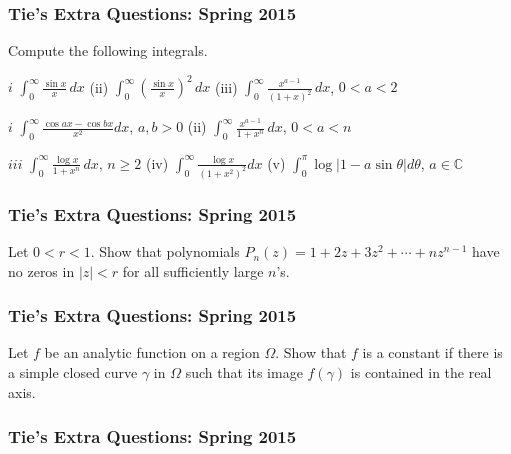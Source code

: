 \hypertarget{ties-extra-questions-spring-2015-12}{%
\subsubsection{Tie's Extra Questions: Spring
2015}\label{ties-extra-questions-spring-2015-12}}

Compute the following integrals.

\(i\) \(\displaystyle \int_0^\infty \frac{\sin x}{x} \, dx\) (ii)
\(\displaystyle \int_0^\infty (\frac{\sin x}{x})^2 \, dx\) (iii)
\(\displaystyle \int_0^\infty \frac{x^{a-1}}{(1 + x)^2} \, dx\),
\(0< a < 2\)

\(i\) \(\displaystyle \int_0^\infty \frac{\cos a x - \cos bx}{x^2} dx\),
\(a, b >0\) (ii)
\(\displaystyle \int_0^\infty \frac{x^{a-1}}{1 + x^n} \, dx\),
\(0< a < n\)

\(iii\) \(\displaystyle \int_0^\infty \frac{\log x}{1 + x^n} \, dx\),
\(n \geq 2\) (iv)
\(\displaystyle \int_0^\infty \frac{\log x}{(1 + x^2)^2} dx\) (v)
\(\displaystyle \int_0^{\pi} \log|1 - a \sin \theta| d \theta\),
\(a \in \mathbb C\)

\hypertarget{ties-extra-questions-spring-2015-13}{%
\subsubsection{Tie's Extra Questions: Spring
2015}\label{ties-extra-questions-spring-2015-13}}

Let \(0<r<1\). Show that polynomials
\(P_n(z) = 1 + 2z + 3 z^2 + \cdots + n z^{n-1}\) have no zeros in
\(|z|<r\) for all sufficiently large \(n\)'s.

\hypertarget{ties-extra-questions-spring-2015-14}{%
\subsubsection{Tie's Extra Questions: Spring
2015}\label{ties-extra-questions-spring-2015-14}}

Let \(f\) be an analytic function on a region \(\Omega\). Show that
\(f\) is a constant if there is a simple closed curve \(\gamma\) in
\(\Omega\) such that its image \(f(\gamma)\) is contained in the real
axis.

\hypertarget{ties-extra-questions-spring-2015-15}{%
\subsubsection{Tie's Extra Questions: Spring
2015}\label{ties-extra-questions-spring-2015-15}}

